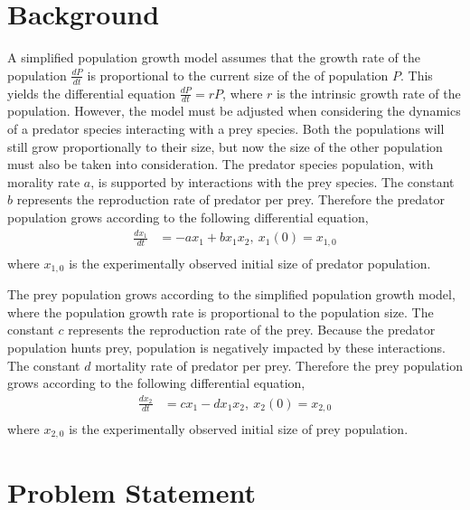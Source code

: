 \documentclass[12pt]{article}   %
\theoremstyle{definition}
\numberwithin{equation}{section}
\begin{document}
\section{Background} \label{APPM2360proj01sec01}
\quad A simplified population growth model assumes that the growth rate of the population $\frac{dP}{dt}$ is proportional to the current size of the of population $P$. This yields the differential equation $\frac{dP}{dt}=rP$, where $r$ is the intrinsic growth rate of the population. However, the model must be adjusted when considering the dynamics of a predator species interacting with a prey species. Both the populations will still grow proportionally to their size, but now the size of the other population must also be taken into consideration. The predator species population, with morality rate $a$, is supported by interactions with the prey species. The constant $b$ represents the reproduction rate of predator per prey. Therefore the predator population grows according to the following differential equation, 
\begin{align*}
%
\frac{dx_1}{dt} & = -ax_1 + bx_1x_2 ,\ x_1(0) = x_{1,0}\\
%
\end{align*}
where $x_{1,0}$ is the experimentally observed initial size of predator population. 

\quad The prey population grows according to the simplified population growth model, where the population growth rate is proportional to the population size. The constant $c$ represents the reproduction rate of the prey. Because the predator population hunts prey, population is negatively impacted by these interactions. The constant $d$ mortality rate of predator per prey. Therefore the prey population grows according to the following differential equation,
\begin{align*}
%
\frac{dx_2}{dt} & = cx_1 - dx_1x_2 ,\ x_2(0) = x_{2,0}\\
%
\end{align*}
where $x_{2,0}$ is the experimentally observed initial size of prey population. 


\setcounter{page}{4}
\section{Problem Statement} \label{APPM2360proj01sec01}




\setcounter{page}{5}
\end{document}

